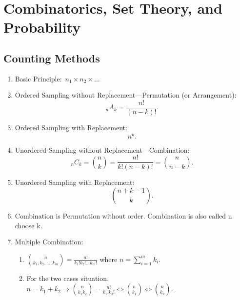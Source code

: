 \chapter{Combinatorics, Set Theory, and Probability}

\section{Counting Methods}
\begin{enumerate}
    \item Basic Principle:~$n_1\times n_2\times \ldots$
    \item Ordered Sampling without Replacement---Permutation (or Arrangement): \[{}_n A_k=\frac{n!}{(n-k)!}.\]
    \item Ordered Sampling with Replacement: \[n^k.\]
    \item Unordered Sampling without Replacement---Combination: \[{}_n C_k=\binom{n}{k}=\frac{n!}{k!(n-k)!}=\binom{n}{n-k}.\]
    \item Unordered Sampling with Replacement: \[\binom{n+k-1}{k}.\]
    \item Combination is Permutation without order. Combination is also called n choose k.
    \item Multiple Combination:{
        \begin{enumerate}
            \item $\binom{n}{k_1,k_2,\ldots,k_m}=\frac{n!}{k_1!k_2!\ldots k_m!}$ where $n=\sum_{i=1}^{m}k_i$.
            \item For the two cases situation, $n=k_1+k_2\Rightarrow \binom{n}{k_1k_2}=\frac{n!}{k_1!k_2!}\iff\binom{n}{k_1}\iff\binom{n}{k_2}$.
        \end{enumerate}
        }
\end{enumerate}

